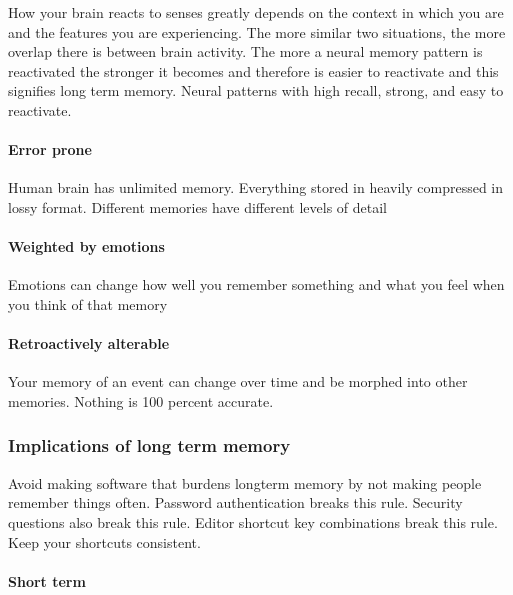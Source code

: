 \documentclass[11pt,]{article}
\let\oldparagraph\paragraph
\renewcommand{\paragraph}[1]{\oldparagraph{#1}\mbox{}}
\begin{document}
How your brain reacts to senses greatly depends on the context in which
you are and the features you are experiencing. The more similar two
situations, the more overlap there is between brain activity. The more a
neural memory pattern is reactivated the stronger it becomes and
therefore is easier to reactivate and this signifies long term memory.
Neural patterns with high recall, strong, and easy to reactivate.

\hypertarget{error-prone}{%
\paragraph{Error prone}\label{error-prone}}

Human brain has unlimited memory. Everything stored in heavily
compressed in lossy format. Different memories have different levels of
detail

\hypertarget{weighted-by-emotions}{%
\paragraph{Weighted by emotions}\label{weighted-by-emotions}}

Emotions can change how well you remember something and what you feel
when you think of that memory

\hypertarget{retroactively-alterable}{%
\paragraph{Retroactively alterable}\label{retroactively-alterable}}

Your memory of an event can change over time and be morphed into other
memories. Nothing is 100 percent accurate.

\hypertarget{implications-of-long-term-memory}{%
\subsubsection{Implications of long term
memory}\label{implications-of-long-term-memory}}

Avoid making software that burdens longterm memory by not making people
remember things often. Password authentication breaks this rule.
Security questions also break this rule. Editor shortcut key
combinations break this rule. Keep your shortcuts consistent.

\hypertarget{short-term}{%
\paragraph{Short term}\label{short-term}}
\end{document}
